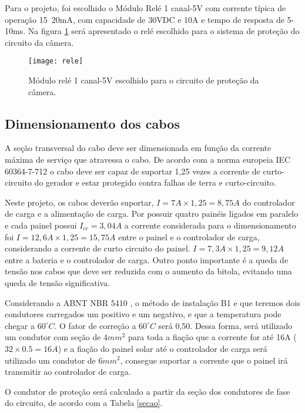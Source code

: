 Para o projeto, foi escolhido o Módulo Relé 1 canal-5V com corrente típica de operação 15~20mA, com capacidade de 30VDC e 10A e tempo de resposta de 5-10ms. Na figura \ref{fig:rele} será apresentado o relé escolhido para o sistema de proteção do circuito da câmera.

\begin{figure}[H]
\centering
\texttt{[image: rele]}
    \caption{Módulo relé 1 canal-5V escolhido para o circuito de proteção da câmera.}
\label{fig:rele}
\end{figure}
\FloatBarrier

\subsection{Dimensionamento dos cabos}

A seção transversal do cabo deve ser dimensionada em função da corrente máxima de serviço que atravessa o cabo. De acordo com a norma europeia IEC 60364-7-712 \cite{instalacao} o cabo deve ser capaz de suportar 1,25 vezes a corrente de curto-circuito do gerador e estar protegido contra falhas de terra e curto-circuito. 

Neste projeto, os cabos deverão suportar, $I = 7A \times 1,25 = 8,75A$ do controlador de carga e a alimentação de carga. Por possuir quatro painéis ligados em paralelo e cada painel possui $I_{cc} = 3,04 A$ a corrente considerada para o dimensionamento foi $I = 12,6A \times 1,25 = 15,75 A$ entre o painel e o  controlador de carga, considerando a corrente de curto circuito do painel. $I = 7,3A \times 1,25 = 9,12 A$ entre a bateria e o controlador de carga. Outro ponto importante é a queda de tensão nos cabos que deve ser reduzida com o aumento da bitola, evitando uma queda de tensão significativa.

Considerando a ABNT NBR 5410 \cite{protecao}, o método de instalação B1 e que teremos dois condutores carregados um positivo e um negativo, e que a temperatura pode chegar a $60^{\circ}C$. O fator de correção a $60^{\circ}C$ será 0,50.  Dessa forma, será utilizado um condutor com seção de $4mm^2$ para toda a fiação que a corrente for até 16A ($32 \times 0.5 = 16A$) e a fiação do painel solar até o controlador de carga será utilizado um condutor de $6mm^2$, consegue suportar a corrente que o painel irá transmitir ao controlador de carga. 

O condutor de proteção será calculado a partir da seção dos condutores de fase do circuito, de acordo com a Tabela \ref{secao}.



